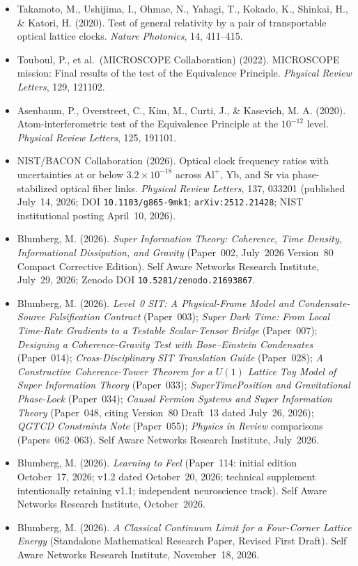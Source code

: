 \begin{itemize}
\item Takamoto, M., Ushijima, I., Ohmae, N., Yahagi, T., Kokado, K., Shinkai, H., \& Katori, H. (2020). Test of general relativity by a pair of transportable optical lattice clocks. \emph{Nature Photonics}, 14, 411--415.
\item Touboul, P., et al.\ (MICROSCOPE Collaboration) (2022). MICROSCOPE mission: Final results of the test of the Equivalence Principle. \emph{Physical Review Letters}, 129, 121102.
\item Asenbaum, P., Overstreet, C., Kim, M., Curti, J., \& Kasevich, M. A. (2020). Atom-interferometric test of the Equivalence Principle at the $10^{-12}$ level. \emph{Physical Review Letters}, 125, 191101.
\item NIST/BACON Collaboration (2026). Optical clock frequency ratios with uncertainties at or below $3.2\times 10^{-18}$ across $\mathrm{Al}^+$, $\mathrm{Yb}$, and $\mathrm{Sr}$ via phase-stabilized optical fiber links. \emph{Physical Review Letters}, 137, 033201 (published July~14, 2026; DOI \texttt{10.1103/g865-9mk1}; \texttt{arXiv:2512.21428}; NIST institutional posting April~10, 2026).
\item Blumberg, M. (2026). \emph{Super Information Theory: Coherence, Time Density, Informational Dissipation, and Gravity} (Paper~002, July~2026 Version~80 Compact Corrective Edition). Self Aware Networks Research Institute, July~29, 2026; Zenodo DOI \texttt{10.5281/zenodo.21693867}.
\item Blumberg, M. (2026). \emph{Level~0 SIT: A Physical-Frame Model and Condensate-Source Falsification Contract} (Paper~003); \emph{Super Dark Time: From Local Time-Rate Gradients to a Testable Scalar-Tensor Bridge} (Paper~007); \emph{Designing a Coherence-Gravity Test with Bose--Einstein Condensates} (Paper~014); \emph{Cross-Disciplinary SIT Translation Guide} (Paper~028); \emph{A Constructive Coherence-Tower Theorem for a $U(1)$ Lattice Toy Model of Super Information Theory} (Paper~033); \emph{SuperTimePosition and Gravitational Phase-Lock} (Paper~034); \emph{Causal Fermion Systems and Super Information Theory} (Paper~048, citing Version~80 Draft~13 dated July~26, 2026); \emph{QGTCD Constraints Note} (Paper~055); \emph{Physics in Review} comparisons (Papers~062--063). Self Aware Networks Research Institute, July~2026.
\item Blumberg, M. (2026). \emph{Learning to Feel} (Paper~114: initial edition October~17, 2026; v1.2 dated October~20, 2026; technical supplement intentionally retaining v1.1; independent neuroscience track). Self Aware Networks Research Institute, October~2026.
\item Blumberg, M. (2026). \emph{A Classical Continuum Limit for a Four-Corner Lattice Energy} (Standalone Mathematical Research Paper, Revised First Draft). Self Aware Networks Research Institute, November~18, 2026.

\end{itemize}

